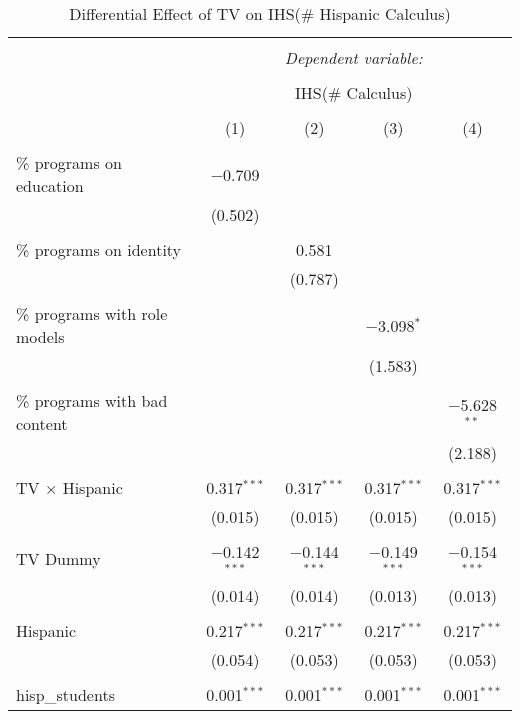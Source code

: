 
\begin{table}[!htbp] \centering 
  \caption{Differential Effect of TV on IHS(\# Hispanic Calculus)} 
  \label{} 
\begin{tabular}{@{\extracolsep{-2pt}}lcccc} 
\\[-1.8ex]\hline 
\hline \\[-1.8ex] 
 & \multicolumn{4}{c}{\textit{Dependent variable:}} \\ 
\cline{2-5} 
\\[-1.8ex] & \multicolumn{4}{c}{IHS(\# Calculus)} \\ 
\\[-1.8ex] & (1) & (2) & (3) & (4)\\ 
\hline \\[-1.8ex] 
 \% programs on education & $-$0.709 &  &  &  \\ 
  & (0.502) &  &  &  \\ 
  & & & & \\ 
 \% programs on identity &  & 0.581 &  &  \\ 
  &  & (0.787) &  &  \\ 
  & & & & \\ 
 \% programs with role models &  &  & $-$3.098$^{*}$ &  \\ 
  &  &  & (1.583) &  \\ 
  & & & & \\ 
 \% programs with bad content &  &  &  & $-$5.628$^{**}$ \\ 
  &  &  &  & (2.188) \\ 
  & & & & \\ 
 TV $\times$ Hispanic & 0.317$^{***}$ & 0.317$^{***}$ & 0.317$^{***}$ & 0.317$^{***}$ \\ 
  & (0.015) & (0.015) & (0.015) & (0.015) \\ 
  & & & & \\ 
 TV Dummy & $-$0.142$^{***}$ & $-$0.144$^{***}$ & $-$0.149$^{***}$ & $-$0.154$^{***}$ \\ 
  & (0.014) & (0.014) & (0.013) & (0.013) \\ 
  & & & & \\ 
 Hispanic & 0.217$^{***}$ & 0.217$^{***}$ & 0.217$^{***}$ & 0.217$^{***}$ \\ 
  & (0.054) & (0.053) & (0.053) & (0.053) \\ 
  & & & & \\ 
 hisp\_students & 0.001$^{***}$ & 0.001$^{***}$ & 0.001$^{***}$ & 0.001$^{***}$ \\ 

\end{tabular}
\end{table}
